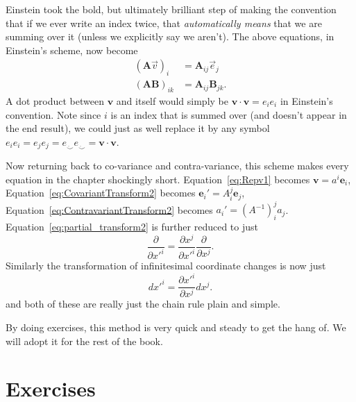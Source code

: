 \documentclass[../master.tex]{subfiles}
\begin{document}
	Einstein took the bold, but ultimately brilliant step of making the convention that if we ever write an index twice, that \emph{automatically means} that we are summing over it (unless we explicitly say we aren't). The above equations, in Einstein's scheme, now become
	\begin{align*}
		(\mathbf A \vec v)_i & =  \mathbf A_{ij} \vec e_j \\
		(\mathbf A \mathbf{B})_{ik} & = \mathbf A_{ij} \mathbf B_{jk}.
	\end{align*}
	A dot product between $\mathbf v$ and itself would simply be $\mathbf v\cdot \mathbf v = e_i e_i$ in Einstein's convention. Note since $i$ is an index that is summed over (and doesn't appear in the end result), we could just as well replace it by any symbol $e_i e_i = e_j e_j = e_{\ddot \smile} e_{\ddot \smile} = \mathbf v \cdot \mathbf v$.
	
	Now returning back to co-variance and contra-variance, this scheme makes every equation in the chapter shockingly short. Equation~\eqref{eq:Repv1} becomes $\mathbf v = a^i \mathbf e_i$, Equation~\eqref{eq:CovariantTransform2} becomes $\mathbf e_i' = A^j_i \mathbf e_j$, Equation~\eqref{eq:ContravariantTransform2} becomes $a_i' = (A^{-1})^j_i a_j$. Equation~\eqref{eq:partial_transform2} is further reduced to just 
	\begin{equation}\label{eq:covariant_einstein}
		\frac{\partial}{\partial {x'}^i} = \frac{\partial x^j}{\partial {x'}^i} \frac{\partial}{\partial x^j}.
	\end{equation}
	Similarly the transformation of infinitesimal coordinate changes is now just
	\begin{equation}\label{eq:contravariant_einstein}
		dx'^i = \frac{\partial {x'}^i}{\partial x^j} dx^j.
	\end{equation}
	and both of these are really just the chain rule plain and simple.
	

	By doing exercises, this method is very quick and steady to get the hang of. We will adopt it for the rest of the book.

	
	\section{Exercises} %
	\label{sec:exercises1}
	
\end{document}
